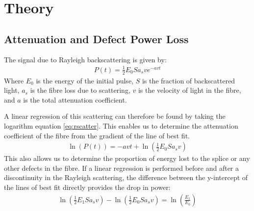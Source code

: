 \section{Theory}
\subsection{Attenuation and Defect Power Loss}
The signal due to Rayleigh backscattering is given by:
\begin{align}
	P(t) = \frac{1}{2} E_0 S a_s v e ^{-a v t}
	\label{eq:rscatter}
\end{align}
Where $E_0$ is the energy of the initial pulse,
$S$ is the fraction of backscattered light,
$a_s$ is the fibre loss due to scattering,
$v$ is the velocity of light in the fibre, and
$a$ is the total attenuation coefficient.\cite{supnotes}

A linear regression of this scattering can therefore be found by taking the logarithm equation \eqref{eq:rscatter}. 
This enables us to determine the attenuation coefficient of the fibre from the gradient of the line of best fit.
\begin{align}
	\ln\left(P(t)\right) = -a vt + \ln \left(\frac{1}{2} E_0 S a_s v \right)
	\label{eq:regression}
\end{align}
This also allows us to determine the proportion of energy lost to the splice or any other defects in the fibre. If a linear regression is performed before and after a discontinuity in the Rayleigh scattering, the difference between the y-intercept of the lines of best fit directly provides the drop in power:
\begin{align}
	\ln \left(\frac{1}{2} E_1 S a_s v \right) - \ln \left(\frac{1}{2} E_0 S a_s v \right) = \ln\left( \frac{E_1}{E_0}\right)
	\label{eq:powerloss}
\end{align}

